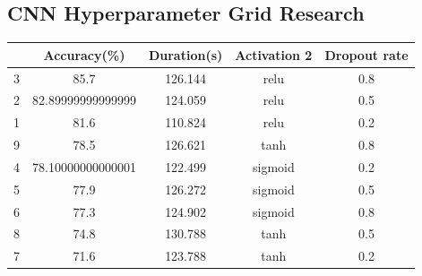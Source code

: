 \newpage

\subsection*{CNN Hyperparameter Grid Research}

\begin{table}[h]
\centering
\begin{tabular}{@{}ccccc@{}}
\toprule
  & Accuracy(\%)      & Duration(s) & Activation 2 & Dropout rate \\ \midrule
3 & 85.7              & 126.144     & relu         & 0.8          \\
2 & 82.89999999999999 & 124.059     & relu         & 0.5          \\
1 & 81.6              & 110.824     & relu         & 0.2          \\
9 & 78.5              & 126.621     & tanh         & 0.8          \\
4 & 78.10000000000001 & 122.499     & sigmoid      & 0.2          \\
5 & 77.9              & 126.272     & sigmoid      & 0.5          \\
6 & 77.3              & 124.902     & sigmoid      & 0.8          \\
8 & 74.8              & 130.788     & tanh         & 0.5          \\
7 & 71.6              & 123.788     & tanh         & 0.2          \\ \bottomrule
\end{tabular}
\end{table}